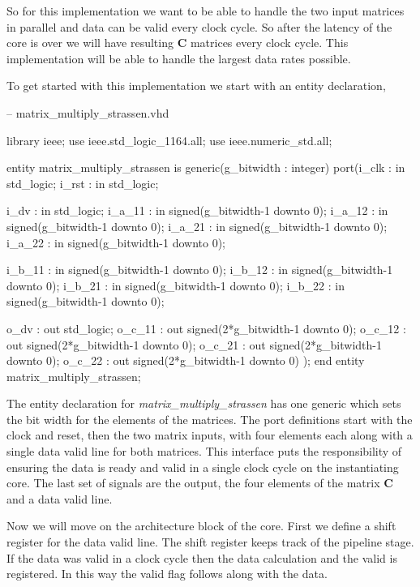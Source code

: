 So for this implementation we want to be able to handle the two input matrices in parallel and data can be valid every clock cycle. So after the latency of the core is over we will have resulting $\mathbf{C}$ matrices every clock cycle. This implementation will be able to handle the largest data rates possible. 

To get started with this implementation we start with an entity declaration,

\begin{VHDLlisting}[tabsize=2]
-- matrix_multiply_strassen.vhd

library ieee;
	use ieee.std_logic_1164.all;
	use ieee.numeric_std.all;
	
entity matrix_multiply_strassen is
	generic(g_bitwidth : integer)
	port(i_clk    : in    std_logic;
		 i_rst    : in    std_logic;
		 
		 i_dv     : in    std_logic;
		 i_a_11   : in    signed(g_bitwidth-1 downto 0);
		 i_a_12   : in    signed(g_bitwidth-1 downto 0);
		 i_a_21   : in    signed(g_bitwidth-1 downto 0);
		 i_a_22   : in    signed(g_bitwidth-1 downto 0);
		
		 i_b_11   : in    signed(g_bitwidth-1 downto 0);
		 i_b_12   : in    signed(g_bitwidth-1 downto 0);
		 i_b_21   : in    signed(g_bitwidth-1 downto 0);
		 i_b_22   : in    signed(g_bitwidth-1 downto 0);
		 
		 o_dv     :   out std_logic;
		 o_c_11   :   out signed(2*g_bitwidth-1 downto 0);
		 o_c_12   :   out signed(2*g_bitwidth-1 downto 0);
		 o_c_21   :   out signed(2*g_bitwidth-1 downto 0);
		 o_c_22   :   out signed(2*g_bitwidth-1 downto 0)	
	);
end entity matrix_multiply_strassen;
\end{VHDLlisting}

The entity declaration for \emph{matrix\_multiply\_strassen} has one generic which sets the bit width for the elements of the matrices. The port definitions start with the clock and reset, then the two matrix inputs, with four elements each along with a single data valid line for both matrices. This interface puts the responsibility of ensuring the data is ready and valid in a single clock cycle on the instantiating core. The last set of signals are the output, the four elements of the matrix $\mathbf{C}$ and a data valid line. 

Now we will move on the architecture block of the core. First we define a shift register for the data valid line. The shift register keeps track of the pipeline stage. If the data was valid in a clock cycle then the data calculation and the valid is registered. In this way the valid flag follows along with the data. 

